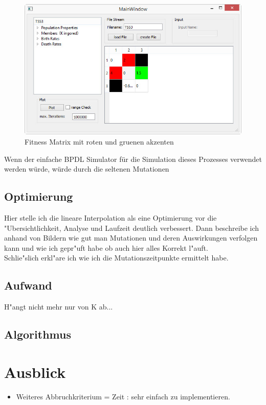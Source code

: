 \documentclass[11pt, a4paper, german]{article}
\begin{document}
\begin{figure}[H]
	\centering
	\includegraphics[width=0.7\linewidth]{./Pictures/MainWindow_red_green_loaded}
	\caption[MainWindow_redGreenFitness]{Fitness Matrix mit roten und gruenen akzenten}
	\label{fig:MainWindow_red_green_loaded}
\end{figure}
Wenn der einfache BPDL Simulator für die Simulation dieses Prozesses verwendet werden würde, würde durch die seltenen Mutationen

	\subsection{Optimierung}
	Hier stelle ich die lineare Interpolation als eine Optimierung vor die "Ubersichtlichkeit, Analyse und Laufzeit deutlich verbessert. Dann beschreibe ich anhand von Bildern wie gut man Mutationen und deren Auswirkungen verfolgen kann und wie ich gepr"uft habe ob auch hier alles Korrekt l"auft.\\
	Schlie"slich erkl"are ich wie ich die Mutationszeitpunkte ermittelt habe.
	
	\subsection{Aufwand}
	H"angt nicht mehr nur von K ab...
	
	\subsection{Algorithmus}
\clearpage
\section{Ausblick}

\begin{itemize}
	\item Weiteres Abbruchkriterium = Zeit : sehr einfach zu implementieren.
\end{itemize}
\end{document}
